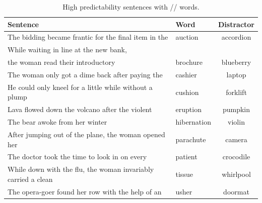 \begin{table}[!h]
\caption{High predictability sentences with /\textesh/ words.}
\label{tbl:senthighsh}
\small
\centering
\begin{tabular}{llc}
\toprule
Sentence                                                                     & Word        & Distractor  \\
\midrule
The bidding became frantic for the final item in the                     & auction     & accordion  \\
While waiting in line at the new bank,  & & \\
the woman read their introductory & brochure    & blueberry  \\
The woman only got a dime back after paying the                          & cashier     & laptop     \\
He could only kneel for a little while without a plump                   & cushion     & forklift   \\
Lava flowed down the volcano after the violent                           & eruption    & pumpkin    \\
The bear awoke from her winter                                           & hibernation & violin     \\
After jumping out of the plane, the woman opened her                     & parachute   & camera     \\
The doctor took the time to look in on every                             & patient     & crocodile  \\
While down with the flu, the woman invariably carried a clean            & tissue      & whirlpool  \\
The opera-goer found her row with the help of an                         & usher       & doormat   \\
\bottomrule
\end{tabular}
\end{table}


